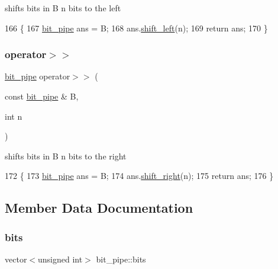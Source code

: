 shifts bits in B n bits to the left 


\begin{DoxyCode}
166                                                \{
167   \hyperlink{classbit__pipe}{bit\_pipe} ans = B;
168   ans.\hyperlink{classbit__pipe_a148fab2b6b3ee730fbaa52539d5a4d74}{shift\_left}(n);
169   \textcolor{keywordflow}{return} ans;
170 \}
\end{DoxyCode}
\mbox{\label{classbit__pipe_a7de74a16947432771bc4001f8fd7079d}} 
\subsubsection{\texorpdfstring{operator$>$$>$}{operator>>}}
{\footnotesize\ttfamily \hyperlink{classbit__pipe}{bit\+\_\+pipe} operator$>$$>$ (\begin{DoxyParamCaption}\item[{const \hyperlink{classbit__pipe}{bit\+\_\+pipe} \&}]{B,  }\item[{int}]{n }\end{DoxyParamCaption})\hspace{0.3cm}{\ttfamily [friend]}}



shifts bits in B n bits to the right 


\begin{DoxyCode}
172                                                \{
173   \hyperlink{classbit__pipe}{bit\_pipe} ans = B;
174   ans.\hyperlink{classbit__pipe_a341a1f62d728a67f730503ca722a7770}{shift\_right}(n);
175   \textcolor{keywordflow}{return} ans;
176 \}
\end{DoxyCode}


\subsection{Member Data Documentation}
\mbox{\label{classbit__pipe_a86f38af1e9736b053728033490476b50}} 
\subsubsection{\texorpdfstring{bits}{bits}}
{\footnotesize\ttfamily vector$<$unsigned int$>$ bit\+\_\+pipe\+::bits\hspace{0.3cm}{\ttfamily [private]}}



